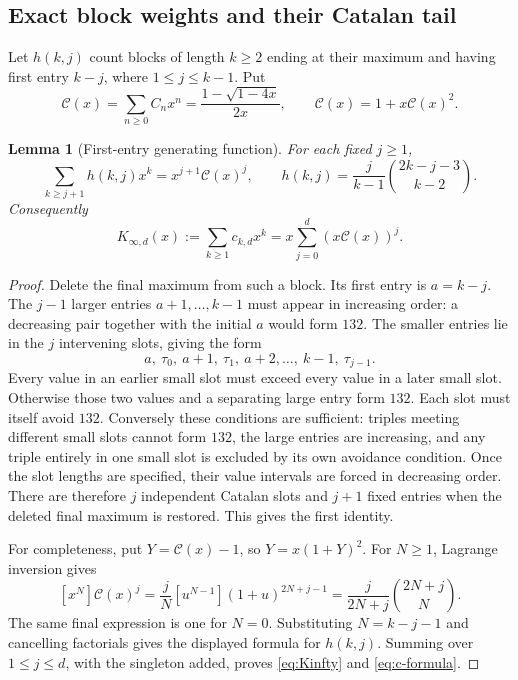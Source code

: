 \documentclass[11pt,a4paper]{article}
\newtheorem{lemma}[lemma]{Lemma}
\theoremstyle{definition}\newaliascnt{definition}{theorem}
\theoremstyle{remark}\newaliascnt{remark}{theorem}
\newcommand{\Cat}{\mathcal C}
\begin{document}
\subsection{Exact block weights and their Catalan tail}
\label{sec:block-weights}
Let $h(k,j)$ count blocks of length $k\ge2$ ending at their maximum and
having first entry $k-j$, where $1\le j\le k-1$. Put
\[
 \Cat(x)=\sum_{n\ge0}C_nx^n
 =\frac{1-\sqrt{1-4x}}{2x},\qquad \Cat(x)=1+x\Cat(x)^2.
\]

\begin{lemma}[First-entry generating function]\label{lem:firstentry}
For each fixed $j\ge1$,
\begin{equation}
 \sum_{k\ge j+1}h(k,j)x^k=x^{j+1}\Cat(x)^j,
 \qquad
 h(k,j)=\frac{j}{k-1}\binom{2k-j-3}{k-2}.
 \label{eq:h}
\end{equation}
Consequently
\begin{equation}
 K_{\infty,d}(x):=\sum_{k\ge1}c_{k,d}x^k
   =x\sum_{j=0}^d(x\Cat(x))^j.
 \label{eq:Kinfty}
\end{equation}
\end{lemma}
\begin{proof}
Delete the final maximum from such a block. Its first entry is $a=k-j$.
The $j-1$ larger entries $a+1,\ldots,k-1$ must appear in increasing order:
a decreasing pair together with the initial $a$ would form $132$.
The smaller entries lie in the $j$ intervening slots, giving the form
\[
 a,\ \tau_0,\ a+1,\ \tau_1,\ a+2,\ldots,\ k-1,\ \tau_{j-1}.
\]
Every value in an earlier small slot must exceed every value in a later
small slot. Otherwise those two values and a separating large entry form
$132$. Each slot must itself avoid $132$. Conversely these conditions are
sufficient: triples meeting different small slots cannot form $132$, the
large entries are increasing, and any triple entirely in one small slot
is excluded by its own avoidance condition. Once the slot lengths are
specified, their value intervals are forced in decreasing order.
There are therefore $j$ independent Catalan slots and $j+1$ fixed entries
when the deleted final maximum is restored. This gives the first identity.

For completeness, put $Y=\Cat(x)-1$, so $Y=x(1+Y)^2$. For $N\ge1$,
Lagrange inversion gives
\[
 [x^N]\Cat(x)^j
 =\frac{j}{N}[u^{N-1}](1+u)^{2N+j-1}
 =\frac{j}{2N+j}\binom{2N+j}{N}.
\]
The same final expression is one for $N=0$. Substituting $N=k-j-1$ and
cancelling factorials gives the displayed formula for $h(k,j)$.
Summing over $1\le j\le d$, with the singleton added, proves
\eqref{eq:Kinfty} and \eqref{eq:c-formula}.
\end{proof}
\end{document}
